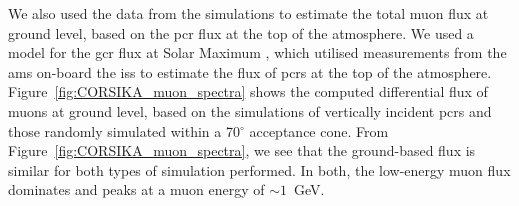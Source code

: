 We also used the data from the simulations to estimate the total muon flux at ground level, based on the \gls{pcr} flux at the top of the atmosphere. We used a model for the \gls{gcr} flux at Solar Maximum \citep{corti_numerical_2019}, which utilised measurements from the \gls{ams} on-board the \gls{iss} to estimate the flux of \glspl{pcr} at the top of the atmosphere. Figure~\ref{fig:CORSIKA_muon_spectra} shows the computed differential flux of muons at ground level, based on the simulations of vertically incident \glspl{pcr} and those randomly simulated within a 70$^\circ$ acceptance cone. From Figure~\ref{fig:CORSIKA_muon_spectra}, we see that the ground-based flux is similar for both types of simulation performed. In both, the low-energy muon flux dominates and peaks at a muon energy of $\sim 1$~GeV.


